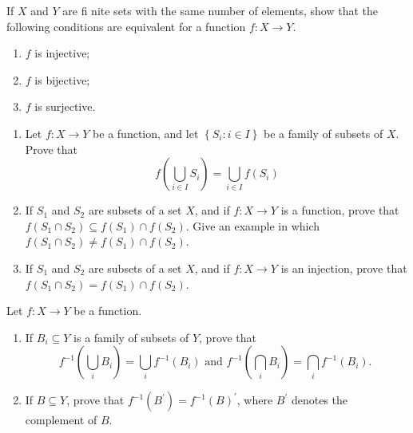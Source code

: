 \begin{questions}
\begin{solution}
    
\end{solution}


    If \(X\) and \(Y\) are fi nite sets with the same number of elements, show that the following conditions are equivalent for a function \(f: X \rightarrow Y\).
    \begin{enumerate}[label=(\alph*)]
        \item \(f\) is injective;
        \item \(f\) is bijective;
        \item \(f\) is surjective.
    \end{enumerate}



\begin{solution}
    
\end{solution}


\question
    \begin{enumerate}[label=(\alph*)]
        \item Let \(f: X \rightarrow Y\) be a function, and let \(\left\{S_i: i \in I\right\}\) be a family of subsets of \(X\). Prove that
\[
f\left(\bigcup_{i \in I} S_i\right)=\bigcup_{i \in I} f\left(S_i\right)
\]

        \item If \(S_1\) and \(S_2\) are subsets of a set \(X\), and if \(f: X \rightarrow Y\) is a function, prove that \(f\left(S_1 \cap S_2\right) \subseteq f\left(S_1\right) \cap f\left(S_2\right)\). Give an example in which \(f\left(S_1 \cap S_2\right) \neq f\left(S_1\right) \cap f\left(S_2\right)\).
        
        \item If \(S_1\) and \(S_2\) are subsets of a set \(X\), and if \(f: X \rightarrow Y\) is an injection, prove that \(f\left(S_1 \cap S_2\right)=f\left(S_1\right) \cap f\left(S_2\right)\).
    \end{enumerate}


\begin{solution}
    
\end{solution}


\question
    Let \(f: X \rightarrow Y\) be a function.
    \begin{enumerate}[label=(\alph*)]
        \item If \(B_i \subseteq Y\) is a family of subsets of \(Y\), prove that
\[
f^{-1}\left(\bigcup_i B_i\right)=\bigcup_i f^{-1}\left(B_i\right) \text { and } f^{-1}\left(\bigcap_i B_i\right)=\bigcap_i f^{-1}\left(B_i\right) \text {. }
\]
        \item If \(B \subseteq Y\), prove that \(f^{-1}\left(B^{\prime}\right)=f^{-1}(B)^{\prime}\), where \(B^{\prime}\) denotes the complement of \(B\).
    \end{enumerate}




\end{questions}
